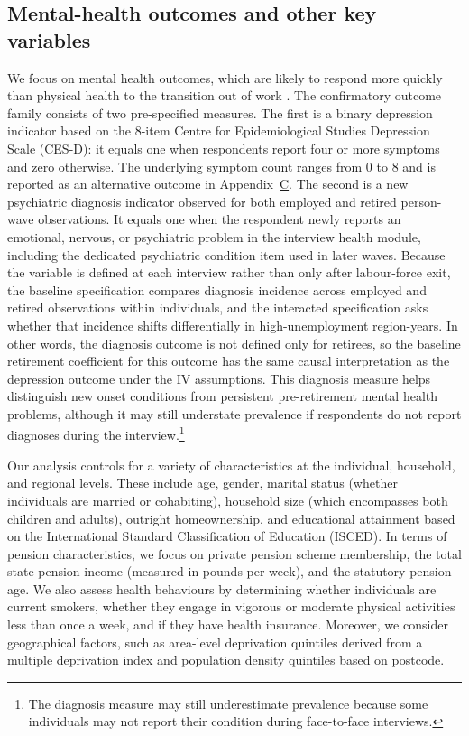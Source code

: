 \documentclass[arguments, manuscript, 11pt]{aastex631}
\begin{document}
\subsection{Mental-health outcomes and other key variables} \label{sec:outcomes}

We focus on mental health outcomes, which are likely to respond more quickly than physical health to the transition out of work \citep{fleischmann2020mental}. The confirmatory outcome family consists of two pre-specified measures. The first is a binary depression indicator based on the 8-item Centre for Epidemiological Studies Depression Scale (CES-D): it equals one when respondents report four or more symptoms and zero otherwise. The underlying symptom count ranges from 0 to 8 and is reported as an alternative outcome in Appendix~\hyperref[sec:appendixC]{C}. The second is a new psychiatric diagnosis indicator observed for both employed and retired person-wave observations. It equals one when the respondent newly reports an emotional, nervous, or psychiatric problem in the interview health module, including the dedicated psychiatric condition item used in later waves. Because the variable is defined at each interview rather than only after labour-force exit, the baseline specification compares diagnosis incidence across employed and retired observations within individuals, and the interacted specification asks whether that incidence shifts differentially in high-unemployment region-years. In other words, the diagnosis outcome is not defined only for retirees, so the baseline retirement coefficient for this outcome has the same causal interpretation as the depression outcome under the IV assumptions. This diagnosis measure helps distinguish new onset conditions from persistent pre-retirement mental health problems, although it may still understate prevalence if respondents do not report diagnoses during the interview.\footnote{The diagnosis measure may still underestimate prevalence because some individuals may not report their condition during face-to-face interviews.}

Our analysis controls for a variety of characteristics at the individual, household, and regional levels. These include age, gender, marital status (whether individuals are married or cohabiting), household size (which encompasses both children and adults), outright homeownership, and educational attainment based on the International Standard Classification of Education (ISCED). In terms of pension characteristics, we focus on private pension scheme membership, the total state pension income (measured in pounds per week), and the statutory pension age. We also assess health behaviours by determining whether individuals are current smokers, whether they engage in vigorous or moderate physical activities less than once a week, and if they have health insurance. Moreover, we consider geographical factors, such as area-level deprivation quintiles derived from a multiple deprivation index and population density quintiles based on postcode.
\end{document}
